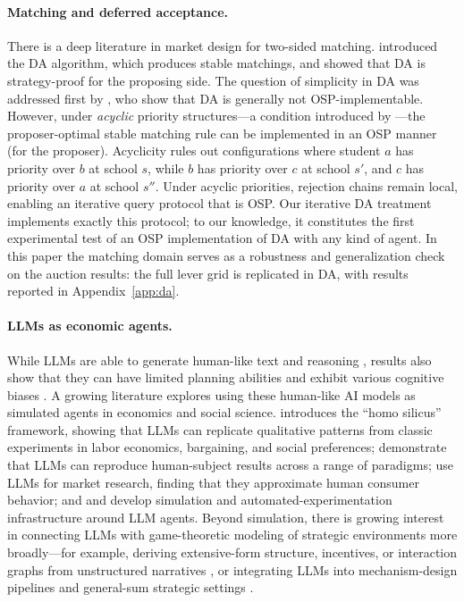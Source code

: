 \paragraph{Matching and deferred acceptance.}
There is a deep literature in market design for two-sided matching. \citet{gale1962college} introduced the DA algorithm, which produces stable matchings, and \citet{roth1982economics} showed that DA is strategy-proof for the proposing side.
The question of simplicity in DA was addressed first by \citet{ashlagi2018stable}, who show that DA is generally not OSP-implementable. However, under \textit{acyclic} priority structures---a condition introduced by \citet{ergin2002efficient}---the proposer-optimal stable matching rule can be implemented in an OSP manner (for the proposer). Acyclicity rules out configurations where student $a$ has priority over $b$ at school $s$, while $b$ has priority over $c$ at school $s'$, and $c$ has priority over $a$ at school $s''$. Under acyclic priorities, rejection chains remain local, enabling an iterative query protocol that is OSP. Our iterative DA treatment implements exactly this protocol; to our knowledge, it constitutes the first experimental test of an OSP implementation of DA with any kind of agent. In this paper the matching domain serves as a robustness and generalization check on the auction results: the full lever grid is replicated in DA, with results reported in Appendix~\ref{app:da}.

\paragraph{LLMs as economic agents.}
While LLMs are able to generate human-like text and reasoning \citep{achiam2023gpt, bubeck2023sparks}, results also show that they can have limited planning abilities and exhibit various cognitive biases \citep{wan2023kelly}. A growing literature explores using these human-like AI models as simulated agents in economics and social science. \citet{horton2023large} introduces the ``homo silicus'' framework, showing that LLMs can replicate qualitative patterns from classic experiments in labor economics, bargaining, and social preferences; \citet{aher2023using} demonstrate that LLMs can reproduce human-subject results across a range of paradigms; \citet{brand2023using} use LLMs for market research, finding that they approximate human consumer behavior; and \citet{park2023generative} and \citet{manning2024automated} develop simulation and automated-experimentation infrastructure around LLM agents. Beyond simulation, there is growing interest in connecting LLMs with game-theoretic modeling of strategic environments more broadly---for example, deriving extensive-form structure, incentives, or interaction graphs from unstructured narratives \citep{daskalakis2024charting}, or integrating LLMs into mechanism-design pipelines and general-sum strategic settings \citep{huang2025accelerated, soumalias2025llm, jiang2025incentive, wang2026llm}.

